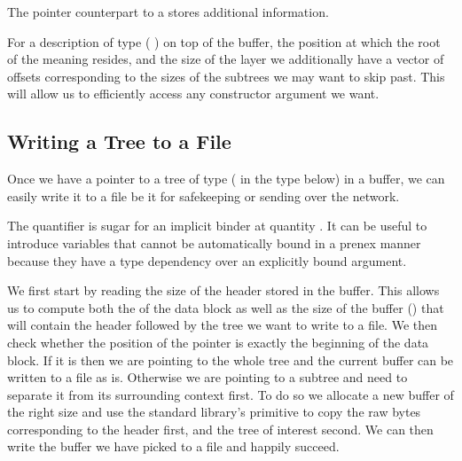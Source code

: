 The pointer counterpart to a  stores
additional information.


For a description of type (   )
on top of the buffer, the position at which the root of the meaning resides,
and the size of the layer we additionally have a vector of  offsets
corresponding to the sizes of the subtrees we may want to skip past.
This will allow us to efficiently access any constructor argument we want.

\subsection{Writing a Tree to a File}\label{sec:writetofile}

Once we have a pointer to a tree  of type 
(   in the type below)
in a buffer, we can easily write it to a file be it for safekeeping
or sending over the network.


\begin{remark}
  The  quantifier is sugar for an implicit
  binder at quantity .
  It can be useful to introduce variables that cannot be automatically
  bound in a prenex manner because they have a type dependency over an
  explicitly bound argument.
\end{remark}


We first start by reading the size of the header stored in the buffer.
%
This allows us to compute both the  of the data block
as well as the size of the buffer () that will
contain the header followed by the tree we want to write to a file.
%
We then check whether the position of the pointer is exactly the beginning
of the data block.
%
If it is then we are pointing to the whole tree and the current buffer can
be written to a file as is.
%
Otherwise we are pointing to a subtree and need to separate it from its
surrounding context first.
%
To do so we allocate a new buffer of the right size and use the
standard library's  primitive to copy the raw bytes
corresponding to the header first, and the tree of interest second.
%
We can then write the buffer we have picked to a file and happily succeed.

